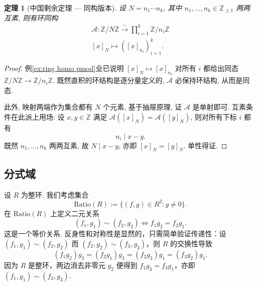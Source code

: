 \documentclass[12pt, a4paper]{ctexart}
\newtheorem{theorem}{\indent 定理}[subsection]
\begin{document}
\begin{tcolorbox}[pikachu]
	\begin{theorem}[中国剩余定理 — 同构版本]
		设 $N = n_1 \cdots n_k$, 其中 $n_1, \ldots, n_k \in \mathbb{Z}_{\geqslant 1}$ 两两互素, 则有环同构
		\begin{align*}
			\mathcal A : \mathbb{Z}/N\mathbb{Z} \xrightarrow{\sim} \prod_{i=1}^k \mathbb{Z}/n_i\mathbb{Z}\\ [x]_N\longmapsto([x]_{n_i})^k_{i=1}.
		\end{align*}
	\end{theorem}
\end{tcolorbox}
\begin{proof}
	例\ref{ex:ring homo pmod}业已说明 $[x]_N \mapsto [x]_{n_i}$ 对所有 $i$ 都给出同态 $\mathbb{Z}/N\mathbb{Z} \rightarrow \mathbb{Z}/n_i\mathbb{Z}$. 既然直积的环结构是逐分量定义的, $\mathcal A$ 必保持环结构, 从而是同态.
	
	此外, 映射两端作为集合都有 $N$ 个元素, 基于抽屉原理, 证 $\mathcal A$ 是单射即可. 互素条件在此派上用场: 设 $x, y \in \mathbb{Z}$ 满足 $\mathcal A([x]_N) = \mathcal A([y]_N)$, 则对所有下标 $i$ 都有
	\[
	n_i \mid x - y.
	\]
	既然 $n_1, \ldots, n_k$ 两两互素, 故 $N \mid x - y$, 亦即 $[x]_N = [y]_N$. 单性得证. 
\end{proof}
\subsection{分式域}
设 $ R $ 为整环. 我们考虑集合
\[ \text{Ratio}(R) := \{(f, g) \in R^2 : g \neq 0\}. \]
在 $\text{Ratio}(R)$ 上定义二元关系
\[ (f_1, g_1) \sim (f_2, g_2) \iff f_1 g_2 = f_2 g_1. \]
这是一个等价关系. 反身性和对称性是显然的，只需简单验证传递性：设 $ (f_1, g_1) \sim (f_2, g_2) $ 而 $ (f_2, g_2) \sim (f_3, g_3) $，则 $ R $ 的交换性导致
\[ (f_1 g_2) g_3 = (f_2 g_1) g_3 = (f_2 g_3) g_1 = (f_3 g_2) g_1. \]
因为 $ R $ 是整环，两边消去非零元 $ g_2 $ 便得到 $ f_1 g_3 = f_3 g_1 $，亦即 $ (f_1, g_1) \sim (f_3, g_3) $. 
\end{document}
